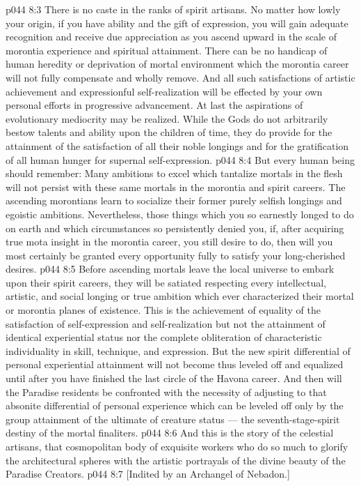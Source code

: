 \vs p044 8:3 \pc There is no caste in the ranks of spirit artisans. No matter how lowly your origin, if you have ability and the gift of expression, you will gain adequate recognition and receive due appreciation as you ascend upward in the scale of morontia experience and spiritual attainment. There can be no handicap of human heredity or deprivation of mortal environment which the morontia career will not fully compensate and wholly remove. And all such satisfactions of artistic achievement and expressionful self\hyp{}realization will be effected by your own personal efforts in progressive advancement. At last the aspirations of evolutionary mediocrity may be realized. While the Gods do not arbitrarily bestow talents and ability upon the children of time, they do provide for the attainment of the satisfaction of all their noble longings and for the gratification of all human hunger for supernal self\hyp{}expression.
\vs p044 8:4 But every human being should remember: Many ambitions to excel which tantalize mortals in the flesh will not persist with these same mortals in the morontia and spirit careers. The ascending morontians learn to socialize their former purely selfish longings and egoistic ambitions. Nevertheless, those things which you so earnestly longed to do on earth and which circumstances so persistently denied you, if, after acquiring true mota insight in the morontia career, you still desire to do, then will you most certainly be granted every opportunity fully to satisfy your long\hyp{}cherished desires.
\vs p044 8:5 Before ascending mortals leave the local universe to embark upon their spirit careers, they will be satiated respecting every intellectual, artistic, and social longing or true ambition which ever characterized their mortal or morontia planes of existence. This is the achievement of equality of the satisfaction of self\hyp{}expression and self\hyp{}realization but not the attainment of identical experiential status nor the complete obliteration of characteristic individuality in skill, technique, and expression. But the new spirit differential of personal experiential attainment will not become thus leveled off and equalized until after you have finished the last circle of the Havona career. And then will the Paradise residents be confronted with the necessity of adjusting to that absonite differential of personal experience which can be leveled off only by the group attainment of the ultimate of creature status --- the seventh\hyp{}stage\hyp{}spirit destiny of the mortal finaliters.
\vs p044 8:6 \pc And this is the story of the celestial artisans, that cosmopolitan body of exquisite workers who do so much to glorify the architectural spheres with the artistic portrayals of the divine beauty of the Paradise Creators.
\vsetoff
\vs p044 8:7 [Indited by an Archangel of Nebadon.]
